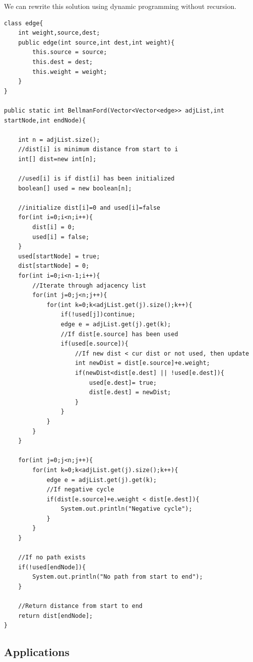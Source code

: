 \documentclass[11pt,oneside]{book}
\begin{document}
We can rewrite this solution using dynamic programming without recursion.

\begin{lstlisting}
class edge{
    int weight,source,dest;
    public edge(int source,int dest,int weight){
        this.source = source;
        this.dest = dest;
        this.weight = weight;
    }
}

public static int BellmanFord(Vector<Vector<edge>> adjList,int startNode,int endNode){
    
    int n = adjList.size();
    //dist[i] is minimum distance from start to i
    int[] dist=new int[n];
    
    //used[i] is if dist[i] has been initialized
    boolean[] used = new boolean[n];
    
    //initialize dist[i]=0 and used[i]=false
    for(int i=0;i<n;i++){
        dist[i] = 0;
        used[i] = false;
    }
    used[startNode] = true;
    dist[startNode] = 0;
    for(int i=0;i<n-1;i++){
        //Iterate through adjacency list
        for(int j=0;j<n;j++){
            for(int k=0;k<adjList.get(j).size();k++){
                if(!used[j])continue;
                edge e = adjList.get(j).get(k);
                //If dist[e.source] has been used
                if(used[e.source]){
                    //If new dist < cur dist or not used, then update
                    int newDist = dist[e.source]+e.weight;
                    if(newDist<dist[e.dest] || !used[e.dest]){
                        used[e.dest]= true; 
                        dist[e.dest] = newDist;
                    }
                }
            }
        }
    }
    
    for(int j=0;j<n;j++){
        for(int k=0;k<adjList.get(j).size();k++){
            edge e = adjList.get(j).get(k);
            //If negative cycle
            if(dist[e.source]+e.weight < dist[e.dest]){
                System.out.println("Negative cycle");
            }
        }
    }
    
    //If no path exists
    if(!used[endNode]){
        System.out.println("No path from start to end");
    }
    
    //Return distance from start to end
    return dist[endNode];
}

\end{lstlisting}

\subsection{Applications}
\end{document}
